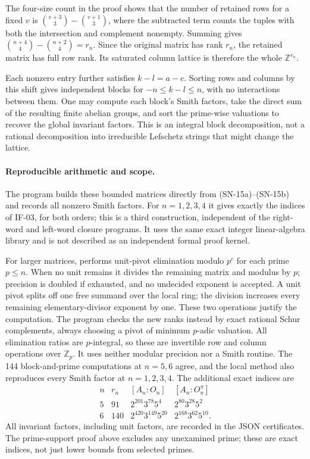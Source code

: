 \documentclass[11pt,a4paper]{article}
\theoremstyle{definition}
\theoremstyle{remark}
\begin{document}
The four-size count in the proof shows that the number of retained
rows for a fixed $v$ is
$\binom{v+3}{3}-\binom{v+1}{3}$, where the subtracted term counts
the tuples with both the intersection and complement nonempty.
Summing gives
$\binom{n+4}{4}-\binom{n+2}{4}=r_n$. Since the original matrix
has rank $r_n$, the retained matrix has full row rank. Its
saturated column lattice is therefore the whole $\mathbb Z^{r_n}$.

Each nonzero entry further satisfies $k-l=a-c$. Sorting rows and
columns by this shift gives independent blocks for
$-n\le k-l\le n$, with no interactions between them. One may
compute each block's Smith factors, take the direct sum of the
resulting finite abelian groups, and sort the prime-wise valuations
to recover the global invariant factors. This is an integral block
decomposition, not a rational decomposition into irreducible
Lefschetz strings that might change the lattice.

\paragraph{Reproducible arithmetic and scope.}
The program  builds these
bounded matrices directly from (SN-15a)--(SN-15b) and records all
nonzero Smith factors. For $n=1,2,3,4$ it gives exactly the
indices of IF-03, for both orders; this is a third construction,
independent of the right-word and left-word closure programs.
It uses the same exact integer linear-algebra library and is
not described as an independent formal proof kernel.

For larger matrices,  performs
unit-pivot elimination modulo $p^c$ for each prime $p\le n$.
When no unit remains it divides the remaining matrix and modulus by
$p$; precision is doubled if exhausted, and no undecided exponent is
accepted. A unit pivot splits off one free summand over the local
ring; the division increases every remaining elementary-divisor
exponent by one. These two operations justify the computation.
The program  checks the
new ranks instead by exact rational Schur complements, always
choosing a pivot of minimum $p$-adic valuation. All elimination
ratios are $p$-integral, so these are invertible row and column
operations over $\mathbb Z_p$. It uses neither modular precision
nor a Smith routine. The 144 block-and-prime computations at
$n=5,6$ agree, and the local method also reproduces every Smith
factor at $n=1,2,3,4$. The additional exact indices are
\[
\begin{array}{c|c|c|c}
n&r_n&[A_n:O_n]&[A_n:O_n^\pi]\\\hline
5&91&2^{201}3^{78}5^4&2^{80}3^{28}5^2\\
6&140&2^{420}3^{149}5^{20}&2^{168}3^{62}5^{10}.
\end{array}                                      \tag{SN-15g}
\]
All invariant factors, including unit factors, are recorded in the
JSON certificates. The prime-support proof above excludes any
unexamined prime; these are exact indices, not just lower bounds
from selected primes.
\end{document}
